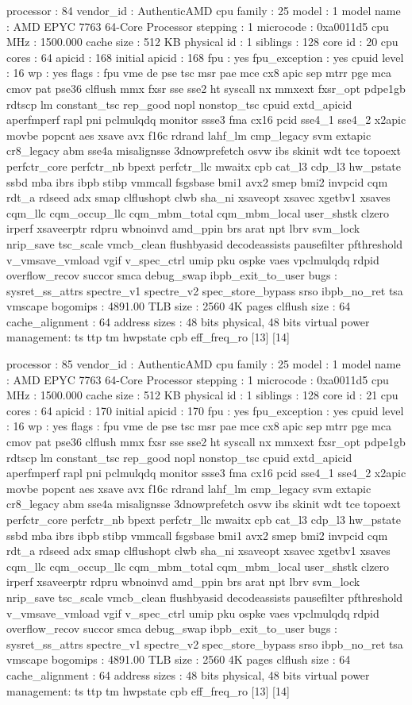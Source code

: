 processor	: 84
vendor_id	: AuthenticAMD
cpu family	: 25
model		: 1
model name	: AMD EPYC 7763 64-Core Processor
stepping	: 1
microcode	: 0xa0011d5
cpu MHz		: 1500.000
cache size	: 512 KB
physical id	: 1
siblings	: 128
core id		: 20
cpu cores	: 64
apicid		: 168
initial apicid	: 168
fpu		: yes
fpu_exception	: yes
cpuid level	: 16
wp		: yes
flags		: fpu vme de pse tsc msr pae mce cx8 apic sep mtrr pge mca cmov pat pse36 clflush mmx fxsr sse sse2 ht syscall nx mmxext fxsr_opt pdpe1gb rdtscp lm constant_tsc rep_good nopl nonstop_tsc cpuid extd_apicid aperfmperf rapl pni pclmulqdq monitor ssse3 fma cx16 pcid sse4_1 sse4_2 x2apic movbe popcnt aes xsave avx f16c rdrand lahf_lm cmp_legacy svm extapic cr8_legacy abm sse4a misalignsse 3dnowprefetch osvw ibs skinit wdt tce topoext perfctr_core perfctr_nb bpext perfctr_llc mwaitx cpb cat_l3 cdp_l3 hw_pstate ssbd mba ibrs ibpb stibp vmmcall fsgsbase bmi1 avx2 smep bmi2 invpcid cqm rdt_a rdseed adx smap clflushopt clwb sha_ni xsaveopt xsavec xgetbv1 xsaves cqm_llc cqm_occup_llc cqm_mbm_total cqm_mbm_local user_shstk clzero irperf xsaveerptr rdpru wbnoinvd amd_ppin brs arat npt lbrv svm_lock nrip_save tsc_scale vmcb_clean flushbyasid decodeassists pausefilter pfthreshold v_vmsave_vmload vgif v_spec_ctrl umip pku ospke vaes vpclmulqdq rdpid overflow_recov succor smca debug_swap ibpb_exit_to_user
bugs		: sysret_ss_attrs spectre_v1 spectre_v2 spec_store_bypass srso ibpb_no_ret tsa vmscape
bogomips	: 4891.00
TLB size	: 2560 4K pages
clflush size	: 64
cache_alignment	: 64
address sizes	: 48 bits physical, 48 bits virtual
power management: ts ttp tm hwpstate cpb eff_freq_ro [13] [14]

processor	: 85
vendor_id	: AuthenticAMD
cpu family	: 25
model		: 1
model name	: AMD EPYC 7763 64-Core Processor
stepping	: 1
microcode	: 0xa0011d5
cpu MHz		: 1500.000
cache size	: 512 KB
physical id	: 1
siblings	: 128
core id		: 21
cpu cores	: 64
apicid		: 170
initial apicid	: 170
fpu		: yes
fpu_exception	: yes
cpuid level	: 16
wp		: yes
flags		: fpu vme de pse tsc msr pae mce cx8 apic sep mtrr pge mca cmov pat pse36 clflush mmx fxsr sse sse2 ht syscall nx mmxext fxsr_opt pdpe1gb rdtscp lm constant_tsc rep_good nopl nonstop_tsc cpuid extd_apicid aperfmperf rapl pni pclmulqdq monitor ssse3 fma cx16 pcid sse4_1 sse4_2 x2apic movbe popcnt aes xsave avx f16c rdrand lahf_lm cmp_legacy svm extapic cr8_legacy abm sse4a misalignsse 3dnowprefetch osvw ibs skinit wdt tce topoext perfctr_core perfctr_nb bpext perfctr_llc mwaitx cpb cat_l3 cdp_l3 hw_pstate ssbd mba ibrs ibpb stibp vmmcall fsgsbase bmi1 avx2 smep bmi2 invpcid cqm rdt_a rdseed adx smap clflushopt clwb sha_ni xsaveopt xsavec xgetbv1 xsaves cqm_llc cqm_occup_llc cqm_mbm_total cqm_mbm_local user_shstk clzero irperf xsaveerptr rdpru wbnoinvd amd_ppin brs arat npt lbrv svm_lock nrip_save tsc_scale vmcb_clean flushbyasid decodeassists pausefilter pfthreshold v_vmsave_vmload vgif v_spec_ctrl umip pku ospke vaes vpclmulqdq rdpid overflow_recov succor smca debug_swap ibpb_exit_to_user
bugs		: sysret_ss_attrs spectre_v1 spectre_v2 spec_store_bypass srso ibpb_no_ret tsa vmscape
bogomips	: 4891.00
TLB size	: 2560 4K pages
clflush size	: 64
cache_alignment	: 64
address sizes	: 48 bits physical, 48 bits virtual
power management: ts ttp tm hwpstate cpb eff_freq_ro [13] [14]

